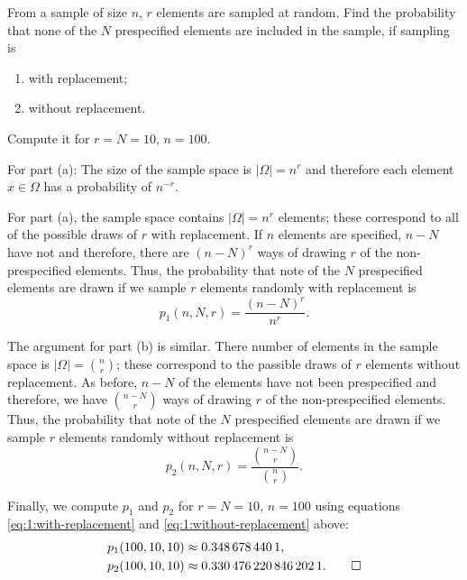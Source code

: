 \begin{problem}[Handout 1, \# 9]
  From a sample of size \(n\), \(r\) elements are sampled at random. Find
  the probability that none of the \(N\) prespecified elements are included
  in the sample, if sampling is
  \begin{enumerate}[label=(\alph*),noitemsep]
  \item with replacement;
  \item without replacement.
  \end{enumerate}
  Compute it for \(r=N=10\), \(n=100\).
\end{problem}
\begin{solution*}
  For part (a): The size of the sample space is \(|\Omega|=n^r\) and
  therefore each element \(x\in\Omega\) has a probability of \(n^{-r}\).

  For part (a), the sample space contains \(|\Omega|=n^r\) elements; these
  correspond to all of the possible draws of \(r\) with replacement. If
  \(n\) elements are specified, \(n-N\) have not and therefore, there are
  \((n-N)^r\) ways of drawing \(r\) of the non-prespecified elements. Thus,
  the probability that note of the \(N\) prespecified elements are drawn if
  we sample \(r\) elements randomly with replacement is
  \begin{equation}
    \label{eq:1:with-replacement}
    p_1(n,N,r)=\frac{(n-N)^r}{n^r}.
  \end{equation}

  The argument for part (b) is similar. There number of elements in the
  sample space is \(|\Omega|=\binom{n}{r}\); these correspond to the
  passible draws of \(r\) elements without replacement. As before, \(n-N\)
  of the elements have not been prespecified and therefore, we have
  \(\binom{n-N}{r}\) ways of drawing \(r\) of the non-prespecified
  elements. Thus, the probability that note of the \(N\) prespecified
  elements are drawn if we sample \(r\) elements randomly without
  replacement is
  \begin{equation}
    \label{eq:1:without-replacement}
    p_2(n,N,r)=\frac{\binom{n-N}{r}}{\binom{n}{r}}.
  \end{equation}

  Finally, we compute \(p_1\) and \(p_2\) for \(r=N=10\), \(n=100\) using
  equations \eqref{eq:1:with-replacement} and
  \eqref{eq:1:without-replacement} above:
  \begin{align*}
    p_1(100,10,10)&\approx\num{0.3486784401},\\
    p_2(100,10,10)&\approx\num{0.3304762208462021}.\qedhere
  \end{align*}
\end{solution*}

